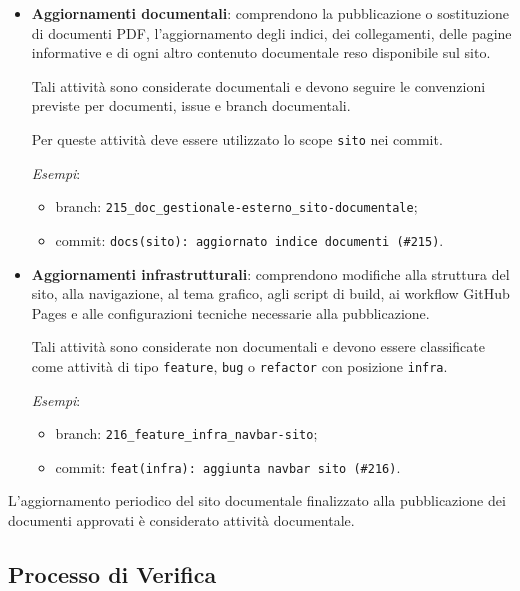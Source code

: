 \begin{itemize}
\item \textbf{Aggiornamenti documentali}: comprendono la pubblicazione o
sostituzione di documenti PDF, l'aggiornamento degli indici, dei collegamenti,
delle pagine informative e di ogni altro contenuto documentale reso disponibile
sul sito.

Tali attività sono considerate documentali e devono seguire le convenzioni
previste per documenti, issue e branch documentali.

Per queste attività deve essere utilizzato lo scope
\texttt{sito} nei commit.

\textit{Esempi}:

\begin{itemize}
    \item branch:
    \texttt{215\_doc\_gestionale-esterno\_sito-documentale};

    \item commit:
    \texttt{docs(sito): aggiornato indice documenti (\#215)}.
\end{itemize}

\item \textbf{Aggiornamenti infrastrutturali}: comprendono modifiche alla
struttura del sito, alla navigazione, al tema grafico, agli script di build,
ai workflow GitHub Pages e alle configurazioni tecniche necessarie alla
pubblicazione.

Tali attività sono considerate non documentali e devono essere classificate
come attività di tipo \texttt{feature}, \texttt{bug} o \texttt{refactor}
con posizione \texttt{infra}.

\textit{Esempi}:

\begin{itemize}
    \item branch:
    \texttt{216\_feature\_infra\_navbar-sito};

    \item commit:
    \texttt{feat(infra): aggiunta navbar sito (\#216)}.
\end{itemize}
\end{itemize}

L'aggiornamento periodico del sito documentale finalizzato alla pubblicazione
dei documenti approvati è considerato attività documentale.


\subsection{Processo di Verifica}
\label{sec:verifica}


